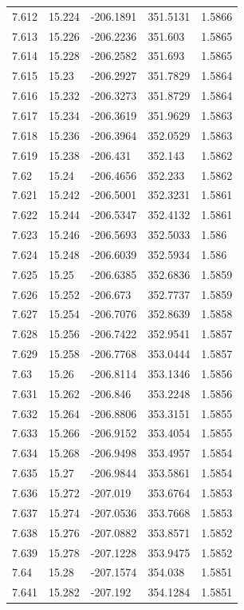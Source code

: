 \begin{tabular}{lllll}
7.612 & 15.224 & -206.1891 & 351.5131 & 1.5866 \\
7.613 & 15.226 & -206.2236 & 351.603 & 1.5865 \\
7.614 & 15.228 & -206.2582 & 351.693 & 1.5865 \\
7.615 & 15.23 & -206.2927 & 351.7829 & 1.5864 \\
7.616 & 15.232 & -206.3273 & 351.8729 & 1.5864 \\
7.617 & 15.234 & -206.3619 & 351.9629 & 1.5863 \\
7.618 & 15.236 & -206.3964 & 352.0529 & 1.5863 \\
7.619 & 15.238 & -206.431 & 352.143 & 1.5862 \\
7.62 & 15.24 & -206.4656 & 352.233 & 1.5862 \\
7.621 & 15.242 & -206.5001 & 352.3231 & 1.5861 \\
7.622 & 15.244 & -206.5347 & 352.4132 & 1.5861 \\
7.623 & 15.246 & -206.5693 & 352.5033 & 1.586 \\
7.624 & 15.248 & -206.6039 & 352.5934 & 1.586 \\
7.625 & 15.25 & -206.6385 & 352.6836 & 1.5859 \\
7.626 & 15.252 & -206.673 & 352.7737 & 1.5859 \\
7.627 & 15.254 & -206.7076 & 352.8639 & 1.5858 \\
7.628 & 15.256 & -206.7422 & 352.9541 & 1.5857 \\
7.629 & 15.258 & -206.7768 & 353.0444 & 1.5857 \\
7.63 & 15.26 & -206.8114 & 353.1346 & 1.5856 \\
7.631 & 15.262 & -206.846 & 353.2248 & 1.5856 \\
7.632 & 15.264 & -206.8806 & 353.3151 & 1.5855 \\
7.633 & 15.266 & -206.9152 & 353.4054 & 1.5855 \\
7.634 & 15.268 & -206.9498 & 353.4957 & 1.5854 \\
7.635 & 15.27 & -206.9844 & 353.5861 & 1.5854 \\
7.636 & 15.272 & -207.019 & 353.6764 & 1.5853 \\
7.637 & 15.274 & -207.0536 & 353.7668 & 1.5853 \\
7.638 & 15.276 & -207.0882 & 353.8571 & 1.5852 \\
7.639 & 15.278 & -207.1228 & 353.9475 & 1.5852 \\
7.64 & 15.28 & -207.1574 & 354.038 & 1.5851 \\
7.641 & 15.282 & -207.192 & 354.1284 & 1.5851 \\

\end{tabular}
